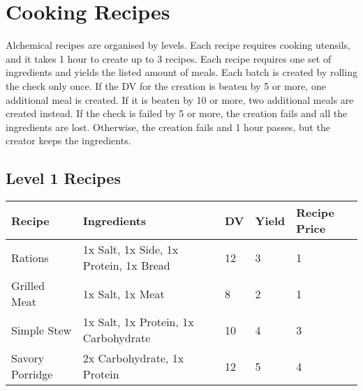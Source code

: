 \section{Cooking Recipes}

Alchemical recipes are organised by levels. Each recipe requires cooking utensils, and it takes 1 hour to create up to 3 recipes. Each recipe requires one set of ingredients and yields the listed amount of meals.
Each batch is created by rolling the check only once.
If the DV for the creation is beaten by 5 or more, one additional meal is created. If it is beaten by 10 or more, two additional meals are created instead.
If the check is failed by 5 or more, the creation fails and all the ingredients are lost. Otherwise, the creation fails and 1 hour passes, but the creator keeps the ingredients.\\


\subsection{Level 1 Recipes}
\begin{longtable}{l | p{2.5cm} | l | p{1cm} | p{1cm} }
	Recipe & Ingredients & DV & Yield & Recipe Price\\ \hline
	Rations & 1x Salt, 1x Side, 1x Protein, 1x Bread & 12 & 3 & 1\\
	Grilled Meat & 1x Salt, 1x Meat & 8 & 2 & 1\\
	Simple Stew & 1x Salt, 1x Protein, 1x Carbohydrate & 10 & 4 & 3\\
	Savory Porridge & 2x Carbohydrate, 1x Protein & 12 & 5 & 4\\ 
\end{longtable}